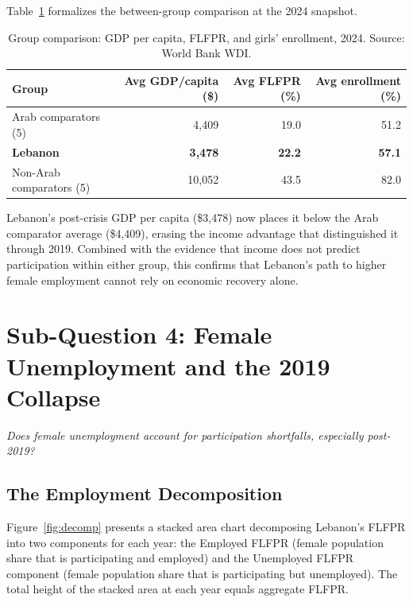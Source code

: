 \documentclass[12pt,a4paper]{article}
\begin{document}
Table~\ref{tab:gdp_compare} formalizes the between-group comparison at the 2024 snapshot.

\begin{table}[H]
\centering
\caption{Group comparison: GDP per capita, FLFPR, and girls' enrollment, 2024. Source: World Bank WDI.}
\label{tab:gdp_compare}
\begin{tabular}{lrrr}
\toprule
\textbf{Group} & \textbf{Avg GDP/capita (\$)} & \textbf{Avg FLFPR (\%)} & \textbf{Avg enrollment (\%)} \\
\midrule
Arab comparators (5)   & 4{,}409 & 19.0 & 51.2 \\
\textbf{Lebanon}       & \textbf{3{,}478} & \textbf{22.2} & \textbf{57.1} \\
Non-Arab comparators (5) & 10{,}052 & 43.5 & 82.0 \\
\bottomrule
\end{tabular}
\end{table}

Lebanon's post-crisis GDP per capita (\$3{,}478) now places it below the Arab comparator average (\$4{,}409), erasing the income advantage that distinguished it through 2019. Combined with the evidence that income does not predict participation within either group, this confirms that Lebanon's path to higher female employment cannot rely on economic recovery alone.

\section{Sub-Question 4: Female Unemployment and the 2019 Collapse}
\label{sec:decomp}

\textit{Does female unemployment account for participation shortfalls, especially post-2019?}

\subsection{The Employment Decomposition}

Figure~\ref{fig:decomp} presents a stacked area chart decomposing Lebanon's FLFPR into two components for each year: the Employed FLFPR (female population share that is participating and employed) and the Unemployed FLFPR component (female population share that is participating but unemployed). The total height of the stacked area at each year equals aggregate FLFPR.
\end{document}
